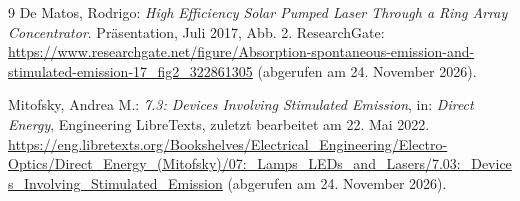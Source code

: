 \begin{thebibliography}{9}
De Matos, Rodrigo: \textit{High Efficiency Solar Pumped Laser Through a Ring Array Concentrator}.
Präsentation, Juli 2017, Abb. 2.
ResearchGate:
\url{https://www.researchgate.net/figure/Absorption-spontaneous-emission-and-stimulated-emission-17_fig2_322861305}
(abgerufen am 24. November 2026).

Mitofsky, Andrea M.: \textit{7.3: Devices Involving Stimulated Emission},
in: \textit{Direct Energy}, Engineering LibreTexts, zuletzt bearbeitet am
22. Mai 2022.
\url{https://eng.libretexts.org/Bookshelves/Electrical_Engineering/Electro-Optics/Direct_Energy_(Mitofsky)/07:_Lamps_LEDs_and_Lasers/7.03:_Devices_Involving_Stimulated_Emission}
(abgerufen am 24. November 2026).

\end{thebibliography}


